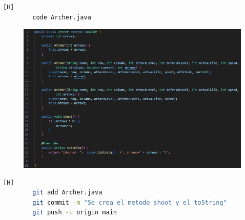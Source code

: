 \documentclass{article}
\begin{document}
	
	\begin{lstlisting}[language=bash,caption={Se crea la subclase Archer }][H]
		code Archer.java
	\end{lstlisting}
	\begin{figure}[H]
		\centering
		\includegraphics[width=1\textwidth,keepaspectratio]{img/archer.jpg}
	\end{figure}	
	\begin{lstlisting}[language=bash,caption={Commit: c3fab4bac8b4e5e7a1463ecc8e1f205b3f755977 }][H]
		git add Archer.java
		git commit -m "Se crea el metodo shoot y el toString"			
		git push -u origin main
	\end{lstlisting}
	
	
	
\end{document}
